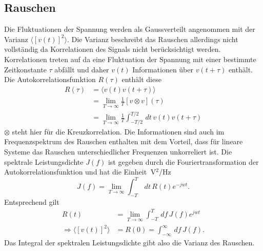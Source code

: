 \subsection{Rauschen}
Die Fluktuationen der Spannung werden als Gaussverteilt angenommen mit der Varianz $\langle\left[v(t)\right]^2\rangle$.
Die Varianz beschreibt das Rauschen allerdings nicht vollständig da Korrelationen des Signals nicht berücksichtigt werden.
Korrelationen treten auf da eine Fluktuation der Spannung mit einer bestimmte Zeitkonstante $\tau$ abfällt und daher $v(t)$ Informationen über $v(t+\tau)$ enthält.
Die Autokorrelationsfunktion $R(\tau)$ enthält diese
\begin{align*}
R(\tau) &= \langle v(t)v(t+\tau)\rangle \\
&= \lim_{T\rightarrow \infty}\frac{1}{T}[v\otimes v](\tau) \\
&= \lim_{T\rightarrow \infty}\frac{1}{T}\int_{-T/2}^{T/2}\,dt\, v(t)v(t+\tau)
\end{align*}
$\otimes$ steht hier für die Kreuzkorrelation.
Die Informationen sind auch im Frequenzspektrum des Rauschen enthalten mit dem Vorteil, dass für lineare Systeme das Rauschen unterschiedlicher Frequenzen unkorreliert ist.
Die spektrale Leistungsdichte $J(f)$ ist gegeben durch die Fouriertransformation der Autokorrelationsfunktion und hat die Einheit $\SI{}{\volt^2\per\hertz}$
\begin{equation}
J(f) = \lim_{T\rightarrow \infty}\int_{-T}^{T}\, dt\, R(t) e^{-jwt}.
\end{equation}
Entsprechend gilt 
\begin{align*}
R(t) &= \lim_{T\rightarrow \infty}\int_{-T}^{T}\,df\, J(f) e^{jwt} \\
\Rightarrow \langle\left[v(t)\right]^2\rangle &= R(0) = \int_{-\infty}^{\infty}\,df\, J(f).
\end{align*}
Das Integral der spektralen Leistungsdichte gibt also die Varianz des Rauschen. 

